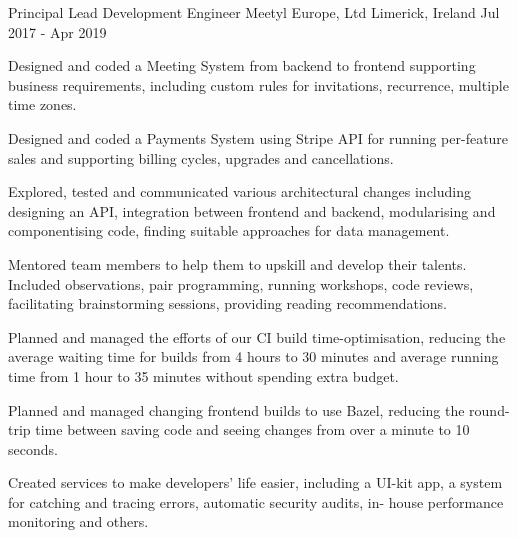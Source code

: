 


\begin{cventries}

  \cventry
    {Principal Lead Development Engineer} %
    {Meetyl Europe, Ltd} %
    {Limerick, Ireland} %
    {Jul 2017 - Apr 2019} %
    {
      \begin{cvitems} %
        \item {Designed and coded a Meeting System from backend to frontend supporting business requirements, including custom rules for invitations, recurrence, multiple time zones.}
        \item {Designed and coded a Payments System using Stripe API for running per-feature sales and supporting billing cycles, upgrades and cancellations.}
        \item {Explored, tested and communicated various architectural changes including designing an API, integration between frontend and backend, modularising and componentising code, finding suitable approaches for data management.}
        \item {Mentored team members to help them to upskill and develop their talents. Included observations, pair programming, running workshops, code reviews, facilitating brainstorming sessions, providing reading recommendations.}
        \item {Planned and managed the efforts of our CI build time-optimisation, reducing the average waiting time for builds from 4 hours to 30 minutes and average running time from 1 hour to 35 minutes without spending extra budget.}
        \item {Planned and managed changing frontend builds to use Bazel, reducing the round-trip time between saving code and seeing changes from over a minute to 10 seconds.}
        \item {Created services to make developers’ life easier, including a UI-kit app, a system for catching and tracing errors, automatic security audits, in- house performance monitoring and others.}
      \end{cvitems}
    }


\end{cventries}
